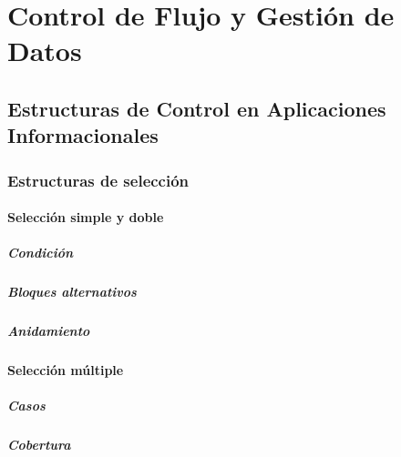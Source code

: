 \documentclass[12pt,twoside]{book}
\begin{document}
	\part{Control de Flujo y Gestión de Datos}
	
	\chapter{Estructuras de Control en Aplicaciones Informacionales}
	
	\section{Estructuras de selección}
	
	\subsection{Selección simple y doble}
	
	\subsubsection{Condición}
	
	\subsubsection{Bloques alternativos}
	
	\subsubsection{Anidamiento}
	
	\subsection{Selección múltiple}
	
	\subsubsection{Casos}
	
	\subsubsection{Cobertura}
	
\end{document}
